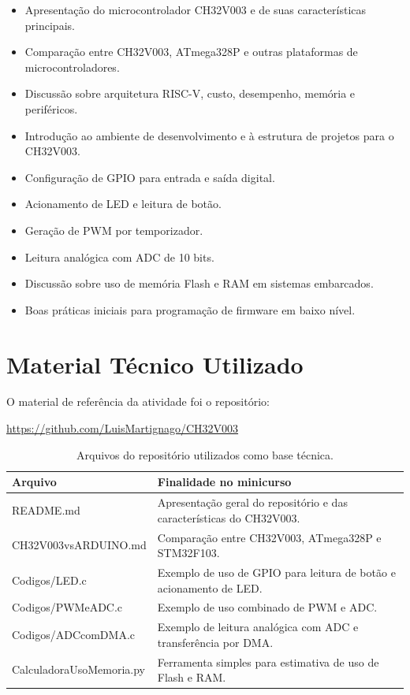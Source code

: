 \documentclass[12pt,a4paper]{article}
\begin{document}
\begin{itemize}[leftmargin=*]
    \item Apresentação do microcontrolador CH32V003 e de suas características principais.
    \item Comparação entre CH32V003, ATmega328P e outras plataformas de microcontroladores.
    \item Discussão sobre arquitetura RISC-V, custo, desempenho, memória e periféricos.
    \item Introdução ao ambiente de desenvolvimento e à estrutura de projetos para o CH32V003.
    \item Configuração de GPIO para entrada e saída digital.
    \item Acionamento de LED e leitura de botão.
    \item Geração de PWM por temporizador.
    \item Leitura analógica com ADC de 10 bits.
    \item Discussão sobre uso de memória Flash e RAM em sistemas embarcados.
    \item Boas práticas iniciais para programação de firmware em baixo nível.
\end{itemize}

\section{Material Técnico Utilizado}

O material de referência da atividade foi o repositório:

\begin{center}
    \url{https://github.com/LuisMartignago/CH32V003}
\end{center}

\begin{table}[H]
    \centering
    \begin{tabularx}{\textwidth}{>{\ttfamily}p{}Y}
        \toprule
        \textnormal{\textbf{Arquivo}} & \textbf{Finalidade no minicurso} \\
        \midrule
        README.md & Apresentação geral do repositório e das características do CH32V003. \\
        CH32V003vsARDUINO.md & Comparação entre CH32V003, ATmega328P e STM32F103. \\
        Codigos/LED.c & Exemplo de uso de GPIO para leitura de botão e acionamento de LED. \\
        Codigos/PWMeADC.c & Exemplo de uso combinado de PWM e ADC. \\
        Codigos/ADCcomDMA.c & Exemplo de leitura analógica com ADC e transferência por DMA. \\
        CalculadoraUsoMemoria.py & Ferramenta simples para estimativa de uso de Flash e RAM. \\
        \bottomrule
    \end{tabularx}
    \caption{Arquivos do repositório utilizados como base técnica.}
\end{table}
\end{document}
